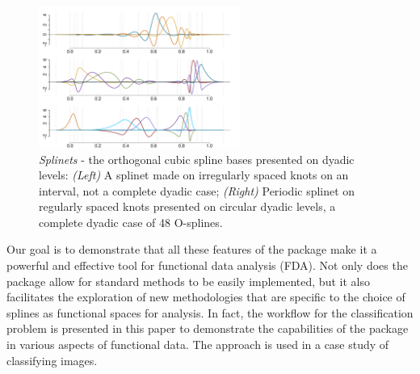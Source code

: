 \begin{figure}
\mbox{}\vspace{-0.5cm}
    \includegraphics[width=0.59\textwidth]{figures/Fig1LeftSplinet.pdf}\hspace{-2.2cm}
     \vspace{-7mm}
    \caption{{\em Splinets} - the orthogonal cubic spline bases presented on dyadic levels: \emph{ (Left)} A splinet made on irregularly spaced knots on an interval, not a complete dyadic case; \emph{ (Right)} Periodic splinet on regularly spaced knots presented on circular dyadic levels, a complete dyadic case of 48 O-splines.}
    \label{fig:splinets}
\end{figure}

Our goal is to demonstrate that all these features of the  package make it a powerful and effective tool for functional data analysis (FDA). Not only does the package allow for standard methods to be easily implemented, but it also facilitates the exploration of new methodologies that are specific to the choice of splines as functional spaces for analysis.
In fact, the workflow for the classification problem is presented in this paper to demonstrate the capabilities of the  package in various aspects of functional data. The approach is used in a case study of classifying images. 


